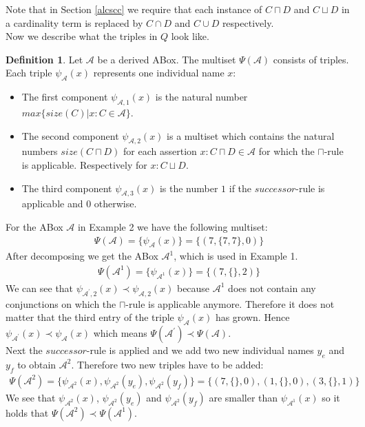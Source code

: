 \documentclass{book}
\theoremstyle{break}
\theoremstyle{definition}
\newtheorem{mydef}{Definition}
\begin{document}
Note that in Section \ref{alcscc} we require that each instance of $C\sqcap D$ and $C\sqcup D$ in a cardinality term is replaced by $C\cap D$ and $C\cup D$ respectively.\\
Now we describe what the triples in $Q$ look like.
\begin{mydef} \label{triples}
Let $\mathcal{A}$ be a derived ABox. The multiset $\Psi(\mathcal{A})$ consists of triples. Each triple $\psi_\mathcal{A}(x)$ represents one individual name $x$:
\begin{itemize}
\item The first component $\psi_{\mathcal{A},1}(x)$ is the natural number $max\{size(C)|x:C\in\mathcal{A}\}$.
\item The second component $\psi_{\mathcal{A},2}(x)$ is a multiset which contains the natural numbers $size(C\sqcap D)$ for each assertion $x:C\sqcap D\in\mathcal{A}$ for which the $\sqcap$-rule is applicable. Respectively for $x:C\sqcup D$.
\item The third component $\psi_{\mathcal{A},3}(x)$ is the number $1$ if the $successor$-rule is applicable and $0$ otherwise.
\end{itemize}
\end{mydef}
For the ABox $\mathcal{A}$ in Example 2 we have the following multiset:
\begin{align}
\Psi(\mathcal{A})=\{\psi_\mathcal{A}(x)\}=\{(7,\{7,7\},0)\}
\end{align}
After decomposing we get the ABox $\mathcal{A}^1$, which is used in Example 1.
\begin{align}
\Psi(\mathcal{A}^1)=\{\psi_{\mathcal{A}^1}(x)\}=\{(7,\{\},2)\}
\end{align}
We can see that $\psi_{\mathcal{A}^\prime,2}(x)\prec\psi_{\mathcal{A},2}(x)$ because $\mathcal{A}^1$ does not contain any conjunctions on which the $\sqcap$-rule is applicable anymore. Therefore it does not matter that the third entry of the triple $\psi_{\mathcal{A}}(x)$ has grown. Hence $\psi_{\mathcal{A}^\prime}(x)\prec\psi_\mathcal{A}(x)$ which means $\Psi(\mathcal{A}^\prime)\prec\Psi(\mathcal{A})$.\\
Next the $successor$-rule is applied and we add two new individual names $y_e$ and $y_f$ to obtain $\mathcal{A}^2$. Therefore two new triples have to be added:
\begin{align}
\Psi(\mathcal{A}^2)=\{\psi_{\mathcal{A}^2}(x),\psi_{\mathcal{A}^2}(y_e), \psi_{\mathcal{A}^2}(y_f)\}=\{(7,\{\},0),(1,\{\},0),(3,\{\},1)\}
\end{align}
We see that $\psi_{\mathcal{A}^2}(x)$, $\psi_{\mathcal{A}^2}(y_e)$ and $\psi_{\mathcal{A}^2}(y_f)$ are smaller than $\psi_{\mathcal{A}^1}(x)$ so it holds that $\Psi(\mathcal{A}^2)\prec \Psi(\mathcal{A}^1)$.\\
\end{document}
